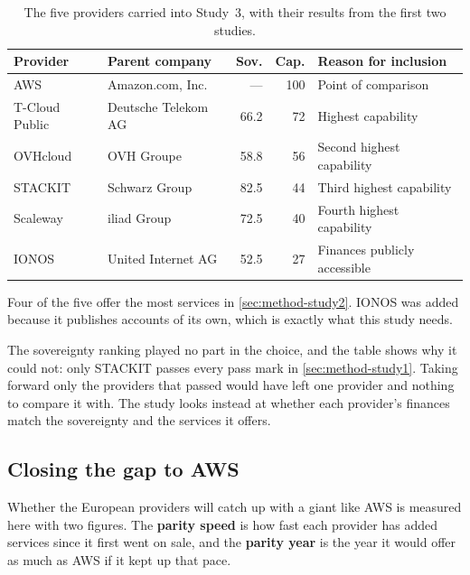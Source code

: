 \begin{table}[htbp]
  \centering
  \caption{The five providers carried into Study~3, with their results from the
           first two studies.}
  \label{tab:study3-providers}
  \small
  \begin{tabularx}{\textwidth}{@{}l l r r X@{}}
    \toprule
    \textbf{Provider} & \textbf{Parent company}
      & \textbf{Sov.} & \textbf{Cap.}
      & \textbf{Reason for inclusion} \\
    \midrule
    \acs{AWS}      & Amazon.com, Inc.      & ---  & 100 & Point of comparison \\
    \midrule
    T-Cloud Public & Deutsche Telekom \acs{AG} & 66.2 & 72 & Highest capability \\
    OVHcloud       & OVH Groupe            & 58.8 & 56 & Second highest capability \\
    STACKIT        & Schwarz Group         & 82.5 & 44 & Third highest capability \\
    Scaleway       & iliad Group           & 72.5 & 40 & Fourth highest capability \\
    IONOS          & United Internet \acs{AG} & 52.5 & 27 & Finances publicly accessible \\
    \bottomrule
  \end{tabularx}
\end{table}

Four of the five offer the most services in \cref{sec:method-study2}. IONOS was
added because it publishes accounts of its own, which is exactly what this study
needs.

The sovereignty ranking played no part in the choice, and the table shows why it
could not: only STACKIT passes every pass mark in \cref{sec:method-study1}. Taking
forward only the providers that passed would have left one provider and nothing to
compare it with. The study looks instead at whether each provider's finances match
the sovereignty and the services it offers.


\subsection{Closing the gap to AWS}

Whether the European providers will catch up with a giant like \acs{AWS} is
measured here with two figures. The \textbf{parity speed} is how fast each provider
has added services since it first went on sale, and the \textbf{parity year} is the
year it would offer as much as \acs{AWS} if it kept up that pace.

